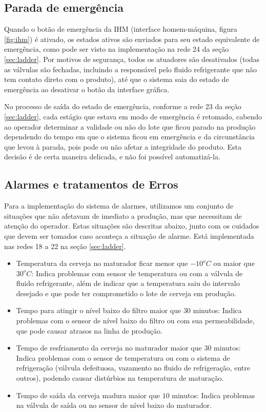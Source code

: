 \documentclass[twoside,twocolumn, 12pt]{paper}
\begin{document}
	\subsection{Parada de emergência}
	Quando o botão de emergência da IHM (interface homem-máquina, figura \ref{fig:ihm}) é ativado, os estados ativos são enviados para seu estado equivalente de emergência, como pode ser visto na implementação na rede 24 da seção \ref{sec:ladder}. Por motivos de segurança, todos os atuadores são desativados (todas as válvulas são fechadas, incluindo a responsável pelo fluido refrigerante que não tem contato direto com o produto), até que o sistema saia do estado de emergência ao desativar o botão da interface gráfica. 
	
	No processo de saída do estado de emergência, conforme a rede 23 da seção \ref{sec:ladder}, cada estágio que estava em modo de emergência é retomado, cabendo ao operador determinar a validade ou não do lote que ficou parado na produção dependendo do tempo em que o sistema ficou em emergência e da circunstância que levou à parada, pois pode ou não afetar a integridade do produto. Esta decisão é de certa maneira delicada, e não foi possível automatizá-la. 
	
	\subsection{Alarmes e tratamentos de Erros}
	Para a implementação do sistema de alarmes, utilizamos um conjunto de situações que não afetavam de imediato a produção, mas que necessitam de atenção do operador. Estas situações são descritas abaixo, junto com os cuidados que devem ser tomados caso aconteça a situação de alarme. Está implementada nas redes 18 a 22 na seção \ref{sec:ladder}.
	\begin{itemize}
		\item Temperatura da cerveja no maturador ficar menor que $-10^oC$ ou maior que $30^oC$: Indica problemas com sensor de temperatura ou com a válvula de fluido refrigerante, além de indicar que a temperatura saiu do intervalo desejado e que pode ter comprometido o lote de cerveja em produção.
		\item Tempo para atingir o nível baixo do filtro maior que $30$ minutos: Indica problemas com o sensor de nível baixo do filtro ou com sua permeabilidade, que pode causar atrasos na linha de produção.
		\item Tempo de resfriamento da cerveja no maturador maior que $30$ minutos: Indica problemas com o sensor de temperatura ou com o sistema de refrigeração (válvula defeituosa, vazamento no fluido de refrigeração, entre outros), podendo causar distúrbios na temperatura de maturação.
		\item Tempo de saída da cerveja madura maior que $10$ minutos: Indica problemas na válvula de saída ou no sensor de nível baixo do maturador.
	\end{itemize}
	
\end{document}
